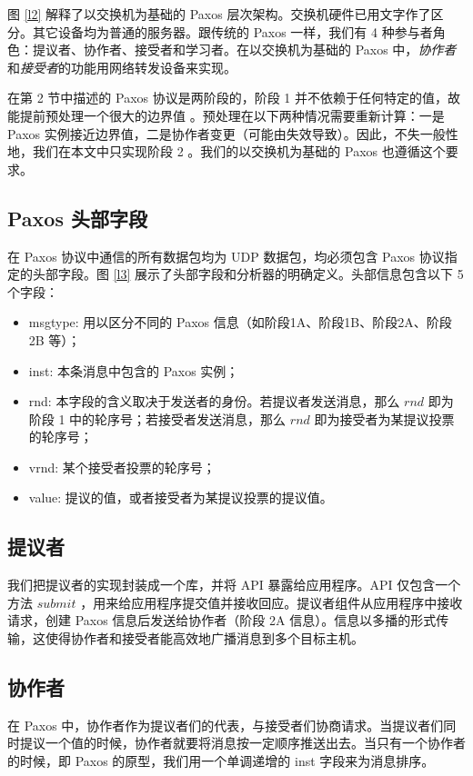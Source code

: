 \documentclass[conference]{IEEEtran}
\begin{document}
图 \ref{l2} 解释了以交换机为基础的 Paxos 层次架构。交换机硬件已用文字作了区分。其它设备均为普通的服务器。跟传统的 Paxos 一样，我们有 4 种参与者角色：提议者、协作者、接受者和学习者。在以交换机为基础的 Paxos 中，\emph{协作者}和\emph{接受者}的功能用网络转发设备来实现。

在第 2 节中描述的 Paxos 协议是两阶段的，阶段 1 并不依赖于任何特定的值，故能提前预处理一个很大的边界值 \cite{b13}。预处理在以下两种情况需要重新计算：一是 Paxos 实例接近边界值，二是协作者变更（可能由失效导致）。因此，不失一般性地，我们在本文中只实现阶段 2 。我们的以交换机为基础的 Paxos 也遵循这个要求。

\subsection{Paxos 头部字段}

在 Paxos 协议中通信的所有数据包均为 UDP 数据包，均必须包含 Paxos 协议指定的头部字段。图 \ref{l3} 展示了头部字段和分析器的明确定义。头部信息包含以下 5 个字段：

\begin{itemize}
\item msgtype: 用以区分不同的 Paxos 信息（如阶段1A、阶段1B、阶段2A、阶段2B 等）；
\item inst: 本条消息中包含的 Paxos 实例；
\item rnd: 本字段的含义取决于发送者的身份。若提议者发送消息，那么 $rnd$ 即为阶段 1 中的轮序号；若接受者发送消息，那么 $rnd$ 即为接受者为某提议投票的轮序号；
\item vrnd: 某个接受者投票的轮序号；
\item value: 提议的值，或者接受者为某提议投票的提议值。
\end{itemize}

\subsection{提议者}

我们把提议者的实现封装成一个库，并将 API 暴露给应用程序。API 仅包含一个方法 $submit$ ，用来给应用程序提交值并接收回应。提议者组件从应用程序中接收请求，创建 Paxos 信息后发送给协作者（阶段 2A 信息）。信息以多播的形式传输，这使得协作者和接受者能高效地广播消息到多个目标主机。

\subsection{协作者}

在 Paxos 中，协作者作为提议者们的代表，与接受者们协商请求。当提议者们同时提议一个值的时候，协作者就要将消息按一定顺序推送出去。当只有一个协作者的时候，即 Paxos 的原型，我们用一个单调递增的 inst 字段来为消息排序。
\end{document}
